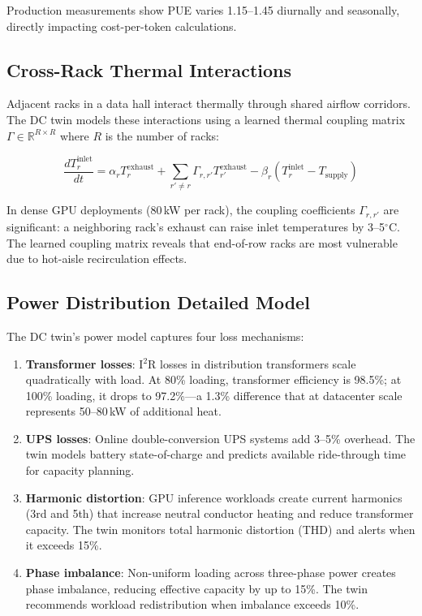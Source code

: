 \documentclass[conference,10pt]{IEEEtran}
\begin{document}
Production measurements show PUE varies 1.15--1.45 diurnally and seasonally, directly impacting cost-per-token calculations.


\subsection{Cross-Rack Thermal Interactions}

Adjacent racks in a data hall interact thermally through shared airflow corridors. The DC twin models these interactions using a learned thermal coupling matrix $\Gamma \in \mathbb{R}^{R \times R}$ where $R$ is the number of racks:

\begin{equation}
\frac{dT_r^{\text{inlet}}}{dt} = \alpha_r T_r^{\text{exhaust}} + \sum_{r' \neq r} \Gamma_{r,r'} T_{r'}^{\text{exhaust}} - \beta_r (T_r^{\text{inlet}} - T_{\text{supply}})
\end{equation}

In dense GPU deployments (80\,kW per rack), the coupling coefficients $\Gamma_{r,r'}$ are significant: a neighboring rack's exhaust can raise inlet temperatures by 3--5$^\circ$C. The learned coupling matrix reveals that end-of-row racks are most vulnerable due to hot-aisle recirculation effects.

\subsection{Power Distribution Detailed Model}

The DC twin's power model captures four loss mechanisms:

\begin{enumerate}
\item \textbf{Transformer losses}: I$^2$R losses in distribution transformers scale quadratically with load. At 80\% loading, transformer efficiency is 98.5\%; at 100\% loading, it drops to 97.2\%---a 1.3\% difference that at datacenter scale represents 50--80\,kW of additional heat.
\item \textbf{UPS losses}: Online double-conversion UPS systems add 3--5\% overhead. The twin models battery state-of-charge and predicts available ride-through time for capacity planning.
\item \textbf{Harmonic distortion}: GPU inference workloads create current harmonics (3rd and 5th) that increase neutral conductor heating and reduce transformer capacity. The twin monitors total harmonic distortion (THD) and alerts when it exceeds 15\%.
\item \textbf{Phase imbalance}: Non-uniform loading across three-phase power creates phase imbalance, reducing effective capacity by up to 15\%. The twin recommends workload redistribution when imbalance exceeds 10\%.
\end{enumerate}
\end{document}
